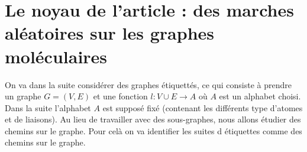\section{Le noyau de l'article : des marches al\'eatoires sur les graphes mol\'eculaires}
    \par
    On va dans la suite consid\'erer des graphes \'etiquett\'es, ce qui consiste \`a prendre un graphe
    $G = (V,E)$ et une fonction $l: V \cup E \rightarrow A$ o\`u $A$ est un alphabet choisi.
    Dans la suite l'alphabet $A$ est suppos\'e fix\'e (contenant les diff\'erents type d'atomes
    et de liaisons). Au lieu de travailler avec des sous-graphes, nous allons \'etudier des chemins
    sur le graphe. Pour cel\`a on va identifier les suites d \'etiquettes comme des chemins sur le 
    graphe.


